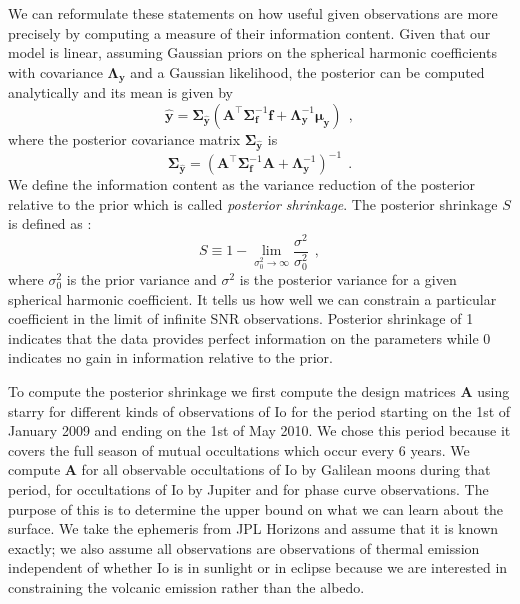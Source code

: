 \documentclass[12pt,dvipsnames]{report}
\newcommand{\hquad}{~~}
\begin{document}
We can reformulate these statements on how useful given observations are more precisely by computing a measure of their information content.
Given that our model is linear, assuming Gaussian priors on the spherical harmonic coefficients with covariance $\boldsymbol{\Lambda}_\mathbf{y}$ and a Gaussian likelihood, the posterior can be computed analytically and its mean is given by
\begin{equation}
    \widehat{\mathbf{y}}=\boldsymbol{\Sigma}_{\hat{\mathbf{y}}}\left(\mathbf{A}^{\top} \boldsymbol{\Sigma}_{\mathbf{f}}^{-1} \mathbf{f}+\boldsymbol{\Lambda}_{\mathbf{y}}^{-1} \boldsymbol{\mu}_{\mathbf{y}}\right)
    \hquad,
    \label{eq:linear_solve_mean}
\end{equation}
where the posterior covariance matrix $\boldsymbol{\Sigma}_{\hat{\mathbf{y}}}$ is 
\begin{equation}
\boldsymbol{\Sigma}_{\hat{\mathbf{y}}}=\left( \mathbf{A}^{\top} \boldsymbol{\Sigma}_{\mathbf{f}}^{-1} \mathbf{A} +\boldsymbol{\Lambda}_{\mathbf{y}}^{-1}\right)^{-1}
\hquad.
    \label{eq:linear_solve_cov}
\end{equation}
We define the information content as the variance reduction of the posterior relative to the prior which is called \emph{posterior shrinkage}.
The posterior shrinkage $S$ is defined as \citep{2021AJ....162..123L,2018arXiv180308393B}:
\begin{equation}
S \equiv 1-\lim _{\sigma_{0}^{2} \rightarrow \infty} \frac{\sigma^{2}}{\sigma_{0}^{2}}
    \hquad,
\end{equation}
where $\sigma^2_0$ is the prior variance and $\sigma^2$ is the posterior variance for a given spherical harmonic coefficient.
It tells us how well we can constrain a particular coefficient in the limit of infinite SNR observations.
Posterior shrinkage of 1 indicates that the data provides perfect information on the parameters while 0 indicates no gain in information relative to the prior.

To compute the posterior shrinkage we first compute the design matrices $\mathbf{A}$ using \textsf{starry} for different kinds of observations of Io for the period starting on the 1st of January 2009 and ending on the 1st of May 2010.
We chose this period because it covers the full season of mutual occultations which occur every 6 years.
We compute $\mathbf{A}$ for all observable occultations of Io by Galilean moons during that period, for occultations of Io by Jupiter and for phase curve observations.
The purpose of this is to determine the upper bound on what we can learn about the surface. 
We take the ephemeris from \textsf{JPL Horizons} and assume that it is known exactly; we also assume all observations are observations of thermal emission independent of whether Io is in sunlight or in eclipse because we are interested in constraining the volcanic emission rather than the albedo.
\end{document}
